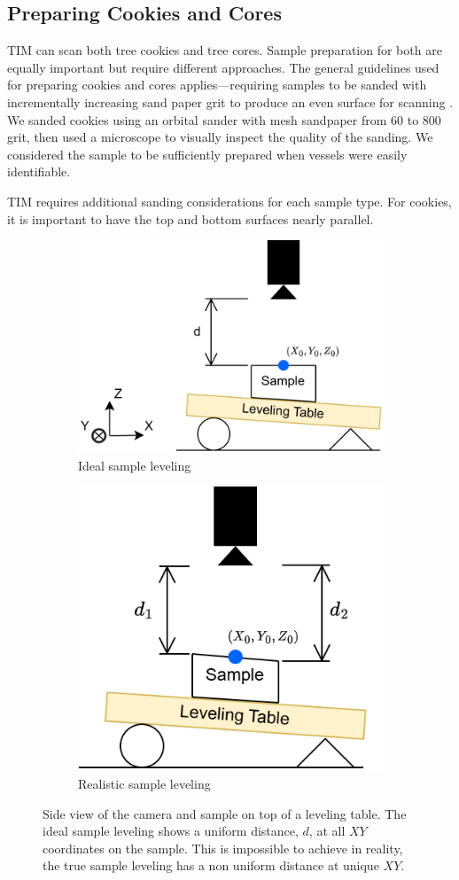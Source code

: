 \documentclass[a4paper,12pt]{article}
\begin{document}
\subsection{Preparing Cookies and Cores}
TIM can scan both tree cookies and tree cores. Sample preparation for both are equally important but require different approaches.
The general guidelines used for preparing cookies and cores applies---requiring samples to be sanded with incrementally increasing sand paper grit to produce an even surface for scanning \citep{speer_fundamentals_2010}. We sanded cookies using an orbital sander with mesh sandpaper from 60 to 800 grit, then used a microscope to visually inspect the quality of the sanding. We considered the sample to be sufficiently prepared when vessels were easily identifiable.

TIM requires additional sanding considerations for each sample type. 
For cookies, it is important to have the top and bottom surfaces nearly parallel. 
\begin{figure}
  \centering
  \begin{subfigure}{.5\textwidth}
    \centering
    \includegraphics[height=0.5\linewidth]{../diagrams/sample_setup_ideal.png}
    \caption{Ideal sample leveling}
    \label{fig:ideal_levelling}
  \end{subfigure}%
  \begin{subfigure}{.5\textwidth}
    \centering
    \includegraphics[height=0.5\linewidth]{../diagrams/sample_setup_realistic.png}
    \caption{Realistic sample leveling}
    \label{fig:realistic_levelling}
  \end{subfigure}
  \caption{Side view of the camera and sample on top of a leveling table. The ideal sample leveling shows a uniform distance, $d$, at all $XY$ coordinates on the sample. This is impossible to achieve in reality, the true sample leveling has a non uniform distance at unique $XY$.}
  \label{fig:sample_levelling}
\end{figure}
\end{document}
